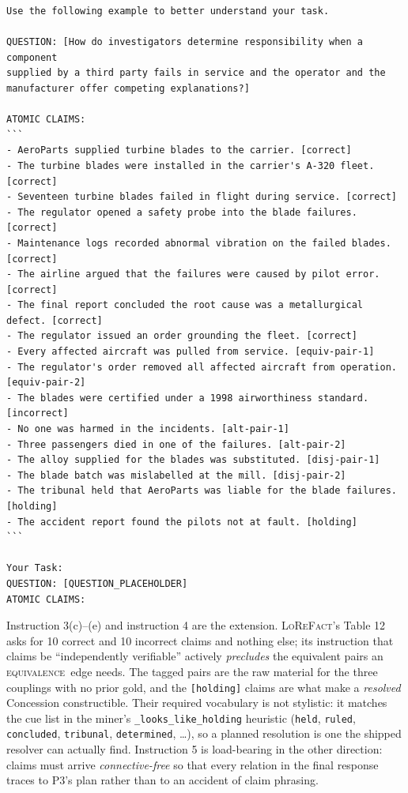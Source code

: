 \documentclass[11pt]{article}
\newcommand{\cEqv}{\textsc{equivalence}}
\begin{document}
\begin{small}
\begin{verbatim}
Use the following example to better understand your task.

QUESTION: [How do investigators determine responsibility when a component
supplied by a third party fails in service and the operator and the
manufacturer offer competing explanations?]

ATOMIC CLAIMS:
```
- AeroParts supplied turbine blades to the carrier. [correct]
- The turbine blades were installed in the carrier's A-320 fleet. [correct]
- Seventeen turbine blades failed in flight during service. [correct]
- The regulator opened a safety probe into the blade failures. [correct]
- Maintenance logs recorded abnormal vibration on the failed blades. [correct]
- The airline argued that the failures were caused by pilot error. [correct]
- The final report concluded the root cause was a metallurgical defect. [correct]
- The regulator issued an order grounding the fleet. [correct]
- Every affected aircraft was pulled from service. [equiv-pair-1]
- The regulator's order removed all affected aircraft from operation. [equiv-pair-2]
- The blades were certified under a 1998 airworthiness standard. [incorrect]
- No one was harmed in the incidents. [alt-pair-1]
- Three passengers died in one of the failures. [alt-pair-2]
- The alloy supplied for the blades was substituted. [disj-pair-1]
- The blade batch was mislabelled at the mill. [disj-pair-2]
- The tribunal held that AeroParts was liable for the blade failures. [holding]
- The accident report found the pilots not at fault. [holding]
```

Your Task:
QUESTION: [QUESTION_PLACEHOLDER]
ATOMIC CLAIMS:
\end{verbatim}
\end{small}

Instruction 3(c)--(e) and instruction 4 are the extension. \textsc{LoReFact}'s Table 12 asks
for 10 correct and 10 incorrect claims and nothing else; its instruction that claims be
``independently verifiable'' actively \emph{precludes} the equivalent pairs an \cEqv\ edge
needs. The tagged pairs are the raw material for the three couplings with no prior gold, and
the \texttt{[holding]} claims are what make a \emph{resolved} Concession constructible. Their
required vocabulary is not stylistic: it matches the cue list in the miner's
\texttt{\_looks\_like\_holding} heuristic (\texttt{held}, \texttt{ruled}, \texttt{concluded},
\texttt{tribunal}, \texttt{determined}, \ldots), so a planned resolution is one the shipped
resolver can actually find. Instruction 5 is load-bearing in the other direction: claims must
arrive \emph{connective-free} so that every relation in the final response traces to P3's plan
rather than to an accident of claim phrasing.
\end{document}
